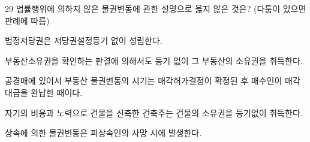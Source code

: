 \begin{question}{29}
법률행위에 의하지 않은 물권변동에 관한 설명으로 옳지 않은 것은? (다툼이 있으면 판례에 따름)
\begin{choices}
  \item 법정저당권은 저당권설정등기 없이 성립한다.
  \item 부동산소유권을 확인하는 판결에 의해서도 등기 없이 그 부동산의 소유권을 취득한다.
  \item 공경매에 있어서 부동산 물권변동의 시기는 매각허가결정이 확정된 후 매수인이 매각대금을 완납한 때이다.
  \item 자기의 비용과 노력으로 건물을 신축한 건축주는 건물의 소유권을 등기없이 취득한다.
  \item 상속에 의한 물권변동은 피상속인의 사망 시에 발생한다.
\end{choices}
\end{question}
